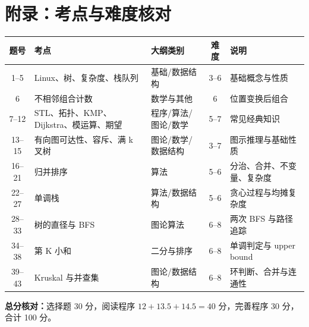 \documentclass[a4paper]{ctexart}
\begin{document}
\clearpage
\section*{附录：考点与难度核对}
\begin{center}
\begin{longtable}{c p{4.2cm} p{3.2cm} c p{5.0cm}}
\toprule
题号 & 考点 & 大纲类别 & 难度 & 说明\\
\midrule
1--5 & Linux、树、复杂度、栈队列 & 基础/数据结构 & 3--6 & 基础概念与性质\\
6 & 不相邻组合计数 & 数学与其他 & 6 & 位置变换后组合\\
7--12 & STL、拓扑、KMP、Dijkstra、模运算、期望 & 程序/算法/图论/数学 & 5--7 & 常见经典知识\\
13--15 & 有向图可达性、容斥、满 k 叉树 & 图论/数学/数据结构 & 3--7 & 图示推理与基础性质\\
16--21 & 归并排序 & 算法 & 5--6 & 分治、合并、不变量、复杂度\\
22--27 & 单调栈 & 算法/数据结构 & 5--6 & 贪心过程与均摊复杂度\\
28--33 & 树的直径与 BFS & 图论算法 & 6--8 & 两次 BFS 与路径追踪\\
34--38 & 第 K 小和 & 二分与排序 & 6--8 & 单调判定与 upper bound\\
39--43 & Kruskal 与并查集 & 图论/数据结构 & 6--8 & 环判断、合并与连通性\\
\bottomrule
\end{longtable}
\end{center}
\noindent\textbf{总分核对：}选择题 30 分，阅读程序 $12+13.5+14.5=40$ 分，完善程序 30 分，合计 100 分。
\end{document}
